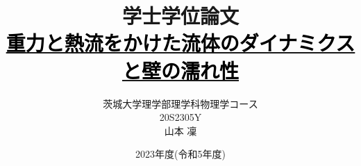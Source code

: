 \documentclass[12pt, dvipdfmx]{jsreport}
\begin{document}
\title{学士学位論文 \\ \href{https://github.com/m-agnet/Report.git}{\textcolor{black}{重力と熱流をかけた流体のダイナミクスと壁の濡れ性}}}
\author{茨城大学理学部理学科物理学コース \\ 20S2305Y \\ 山本 凜}
\date{2023年度(令和5年度)}
\maketitle
\newpage

\setcounter{tocdepth}{3}
\tableofcontents
\newpage









\appendix





\end{document}

